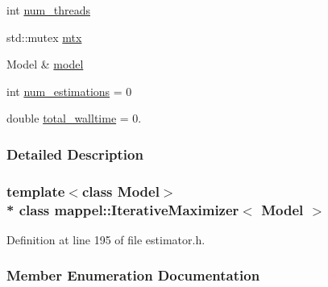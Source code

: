 \begin{DoxyCompactItemize}
\item 
int \hyperlink{classmappel_1_1ThreadedEstimator_a6afa05d7d971f3317ce1602de853123b}{num\+\_\+threads}
\item 
std\+::mutex \hyperlink{classmappel_1_1ThreadedEstimator_a4538fd0860243430bfd47e8064c8cfe4}{mtx}
\item 
Model \& \hyperlink{classmappel_1_1Estimator_a8322546d87ccdf01f8b0dcd9dae509f0}{model}
\item 
int \hyperlink{classmappel_1_1Estimator_ab15b88435d6c50a68fac84465d950b12}{num\+\_\+estimations} = 0
\item 
double \hyperlink{classmappel_1_1Estimator_a5a408458a111c5222193871fa6bb6644}{total\+\_\+walltime} = 0.
\end{DoxyCompactItemize}


\subsubsection{Detailed Description}
\subsubsection*{template$<$class Model$>$\\*
class mappel\+::\+Iterative\+Maximizer$<$ Model $>$}



Definition at line 195 of file estimator.\+h.



\subsubsection{Member Enumeration Documentation}
